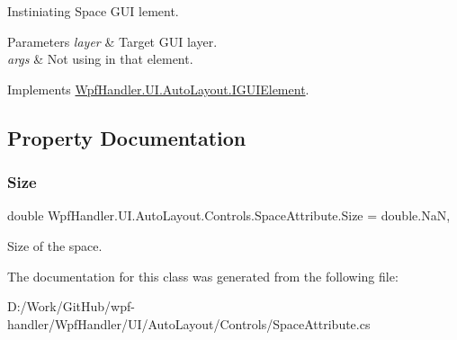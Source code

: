 Instiniating Space G\+UI lement. 


\begin{DoxyParams}{Parameters}
{\em layer} & Target G\+UI layer.\\
\hline
{\em args} & Not using in that element.\\
\hline
\end{DoxyParams}


Implements \mbox{\hyperlink{interface_wpf_handler_1_1_u_i_1_1_auto_layout_1_1_i_g_u_i_element_a0ff16956f8e8187d51e1b36b6b9f894e}{Wpf\+Handler.\+U\+I.\+Auto\+Layout.\+I\+G\+U\+I\+Element}}.



\subsection{Property Documentation}
\mbox{\label{class_wpf_handler_1_1_u_i_1_1_auto_layout_1_1_controls_1_1_space_attribute_a68206a96d773373166c9754a2aff971f}} 
\subsubsection{\texorpdfstring{Size}{Size}}
{\footnotesize\ttfamily double Wpf\+Handler.\+U\+I.\+Auto\+Layout.\+Controls.\+Space\+Attribute.\+Size = double.\+NaN\hspace{0.3cm}{\ttfamily [get]}, {\ttfamily [set]}}



Size of the space. 



The documentation for this class was generated from the following file\+:\begin{DoxyCompactItemize}
\item 
D\+:/\+Work/\+Git\+Hub/wpf-\/handler/\+Wpf\+Handler/\+U\+I/\+Auto\+Layout/\+Controls/Space\+Attribute.\+cs\end{DoxyCompactItemize}
